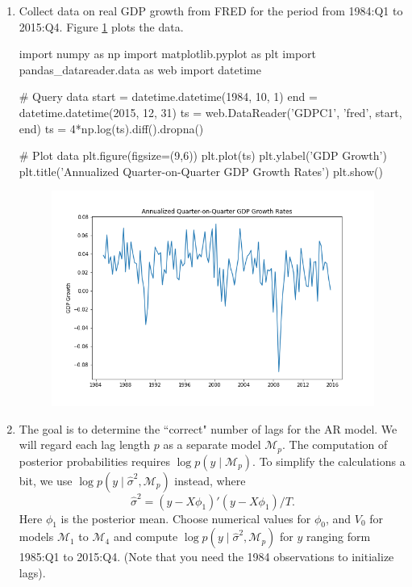\documentclass[oneside,reqno]{amsart}
\newcommand{\M}{\mathcal{M}}
\theoremstyle{definition}
\begin{document}
\begin{enumerate}
\begin{proof}
\begin{align*}
	&= (2\pi \sigma^2)^{-T/2} \frac{| V_0 |^{-1/2}}{| V_1|^{-1/2}}\exp\left(- \frac{1}{2 \sigma^2} \left(y'y + \phi_0'  V_0^{-1} \phi_0 -    \phi_1'  V_1^{-1}  \phi_1 \right) \right),
\end{align*}	
which follows from the fact that the $\phi$ terms must cancel. The log marginal likelihood is then 
\[
	\log p(y \mid \sigma^2) 
	= -\frac{T}{2} \log (2\pi \sigma^2) - \frac{1}{2}\log\frac{| V_0|}{| V_1|} -\frac{1}{2 \sigma^2} \left(y'y+  \phi_0'  V_0^{-1}  \phi_0 -  \phi_1'  V_1^{-1}  \phi_1 \right).
\]
\end{proof}

\item
Collect data on real GDP growth from FRED for the period from 1984:Q1 to 2015:Q4. Figure \ref{gdp-growth} plots the data.

\begin{python3code}
import numpy as np
import matplotlib.pyplot as plt
import pandas_datareader.data as web
import datetime

# Query data
start = datetime.datetime(1984, 10, 1)
end = datetime.datetime(2015, 12, 31)
ts = web.DataReader('GDPC1', 'fred', start, end)
ts = 4*np.log(ts).diff().dropna()

# Plot data
plt.figure(figsize=(9,6))
plt.plot(ts)
plt.ylabel('GDP Growth')
plt.title('Annualized Quarter-on-Quarter GDP Growth Rates')
plt.show()
\end{python3code}

\begin{figure}
\includegraphics[width=\textwidth]{gdp-growth}
\caption{}
\label{gdp-growth}
\end{figure}

\item
The goal is to determine the ``correct" number of lags for the AR model. We will regard each lag length $p$ as a separate model $\M_p$. The computation of posterior probabilities requires $\log p(y \mid \M_p)$. To simplify the calculations a bit, we use $\log p(y \mid \hat \sigma^2, \M_p)$ instead, where 
\[
	\hat \sigma^2 = (y - X \phi_1)' (y-X\phi_1)/T.
\]
Here $\phi_1$ is the posterior mean. Choose numerical values for $\phi_0$, and $V_0$ for models $\M_1$ to $\M_4$ and compute $\log p(y \mid \hat \sigma^2, \M_p)$ for $y$ ranging form 1985:Q1 to 2015:Q4. (Note that you need the 1984 observations to initialize lags).


\end{enumerate}
\end{document}
